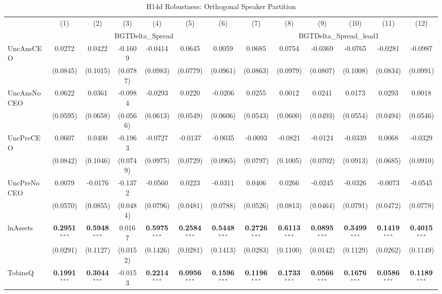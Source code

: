 \begin{landscape}
\begin{table}[H]
\setlength{\tabcolsep}{3pt}
\renewcommand{\arraystretch}{0.85}
\centering
\caption{H14d Robustness: Orthogonal Speaker Partition}
\label{tab:h14d_robust}
\scriptsize
\begin{tabular}{lcccccccccccc}
\toprule
 & (1) & (2) & (3) & (4) & (5) & (6) & (7) & (8) & (9) & (10) & (11) & (12) \\
 & \multicolumn{6}{c}{BGTDelta\_Spread} & \multicolumn{6}{c}{BGTDelta\_Spread\_lead1} \\
\cmidrule(lr){2-7} \cmidrule(lr){8-13}
\midrule
UncAnsCEO & 0.0272 & 0.0422 & -0.1609 & -0.0414 & 0.0645 & 0.0059 & 0.0685 & 0.0754 & -0.0369 & -0.0765 & -0.0281 & -0.0987 \\
 & (0.0845) & (0.1015) & (0.0787) & (0.0983) & (0.0779) & (0.0961) & (0.0863) & (0.0979) & (0.0807) & (0.1008) & (0.0834) & (0.0991) \\
UncAnsNoCEO & 0.0622 & 0.0361 & -0.0984 & -0.0293 & 0.0220 & -0.0206 & 0.0255 & 0.0012 & 0.0241 & 0.0173 & 0.0293 & 0.0018 \\
 & (0.0595) & (0.0658) & (0.0566) & (0.0613) & (0.0549) & (0.0606) & (0.0543) & (0.0600) & (0.0493) & (0.0554) & (0.0494) & (0.0546) \\
UncPreCEO & 0.0607 & 0.0400 & -0.1963 & -0.0727 & -0.0137 & -0.0035 & -0.0093 & -0.0821 & -0.0124 & -0.0339 & 0.0068 & -0.0329 \\
 & (0.0842) & (0.1046) & (0.0749) & (0.0975) & (0.0729) & (0.0965) & (0.0797) & (0.1005) & (0.0702) & (0.0913) & (0.0685) & (0.0910) \\
UncPreNoCEO & 0.0079 & -0.0176 & -0.1372 & -0.0560 & 0.0223 & -0.0311 & 0.0406 & 0.0266 & -0.0245 & -0.0326 & -0.0073 & -0.0545 \\
 & (0.0570) & (0.0855) & (0.0484) & (0.0796) & (0.0481) & (0.0788) & (0.0526) & (0.0813) & (0.0464) & (0.0791) & (0.0472) & (0.0778) \\
\midrule
lnAssets & \textbf{0.2951}$^{***}$ & \textbf{0.5948}$^{***}$ & 0.0167 & \textbf{0.5975}$^{***}$ & \textbf{0.2584}$^{***}$ & \textbf{0.5448}$^{***}$ & \textbf{0.2726}$^{***}$ & \textbf{0.6113}$^{***}$ & \textbf{0.0895}$^{***}$ & \textbf{0.3499}$^{***}$ & \textbf{0.1419}$^{***}$ & \textbf{0.4015}$^{***}$ \\
 & (0.0291) & (0.1127) & (0.0152) & (0.1426) & (0.0281) & (0.1413) & (0.0283) & (0.1100) & (0.0142) & (0.1129) & (0.0262) & (0.1149) \\
TobinsQ & \textbf{0.1991}$^{***}$ & \textbf{0.3044}$^{***}$ & -0.0153 & \textbf{0.2214}$^{***}$ & \textbf{0.0956}$^{***}$ & \textbf{0.1596}$^{***}$ & \textbf{0.1196}$^{***}$ & \textbf{0.1733}$^{***}$ & \textbf{0.0566}$^{***}$ & \textbf{0.1676}$^{***}$ & \textbf{0.0586}$^{***}$ & \textbf{0.1189}$^{***}$ \\

\end{tabular}
\end{table}
\end{landscape}
